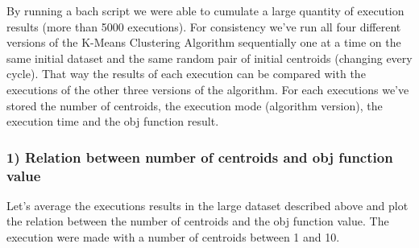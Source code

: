 \documentclass[11pt]{article}
\begin{document}
By running a bach script we were able to cumulate a large quantity of
execution results (more than 5000 executions). For consistency we've run
all four different versions of the K-Means Clustering Algorithm
sequentially one at a time on the same initial dataset and the same
random pair of initial centroids (changing every cycle). That way the
results of each execution can be compared with the executions of the
other three versions of the algorithm. For each executions we've stored
the number of centroids, the execution mode (algorithm version), the
execution time and the obj function result.

\hypertarget{relation-between-number-of-centroids-and-obj-function-value}{%
\subsubsection{1) Relation between number of centroids and obj function
value}\label{relation-between-number-of-centroids-and-obj-function-value}}

Let's average the executions results in the large dataset described
above and plot the relation between the number of centroids and the obj
function value. The execution were made with a number of centroids
between 1 and 10.
\end{document}
